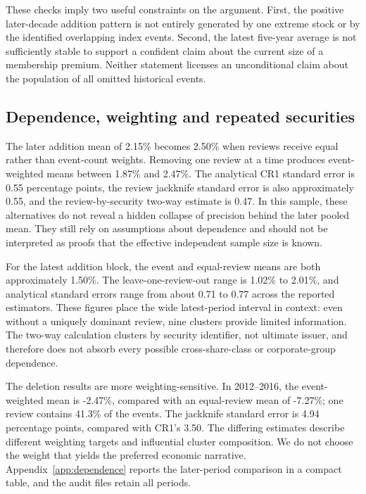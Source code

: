 These checks imply two useful constraints on the argument. First, the positive later-decade addition pattern is not entirely generated by one extreme stock or by the identified overlapping index events. Second, the latest five-year average is not sufficiently stable to support a confident claim about the current size of a membership premium. Neither statement licenses an unconditional claim about the population of all omitted historical events.

\subsection{Dependence, weighting and repeated securities}

The later addition mean of 2.15\% becomes 2.50\% when reviews receive equal rather than event-count weights. Removing one review at a time produces event-weighted means between 1.87\% and 2.47\%. The analytical CR1 standard error is 0.55 percentage points, the review jackknife standard error is also approximately 0.55, and the review-by-security two-way estimate is 0.47. In this sample, these alternatives do not reveal a hidden collapse of precision behind the later pooled mean. They still rely on assumptions about dependence and should not be interpreted as proofs that the effective independent sample size is known.

For the latest addition block, the event and equal-review means are both approximately 1.50\%. The leave-one-review-out range is 1.02\% to 2.01\%, and analytical standard errors range from about 0.71 to 0.77 across the reported estimators. These figures place the wide latest-period interval in context: even without a uniquely dominant review, nine clusters provide limited information. The two-way calculation clusters by security identifier, not ultimate issuer, and therefore does not absorb every possible cross-share-class or corporate-group dependence.

The deletion results are more weighting-sensitive. In 2012--2016, the event-weighted mean is -2.47\%, compared with an equal-review mean of -7.27\%; one review contains 41.3\% of the events. The jackknife standard error is 4.94 percentage points, compared with CR1's 3.50. The differing estimates describe different weighting targets and influential cluster composition. We do not choose the weight that yields the preferred economic narrative. Appendix~\ref{app:dependence} reports the later-period comparison in a compact table, and the audit files retain all periods.


